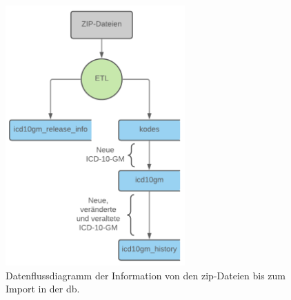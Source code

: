 \begin{figure}[ht]
	\centering
	\includegraphics[height=10cm]{figures/dbflow}
	\caption[Datenfluss des Prozesses]{Datenflussdiagramm der Information von den \ac{zip}-Dateien bis zum Import in der \ac{db}.}
	\label{fig:dbflow}
\end{figure} 